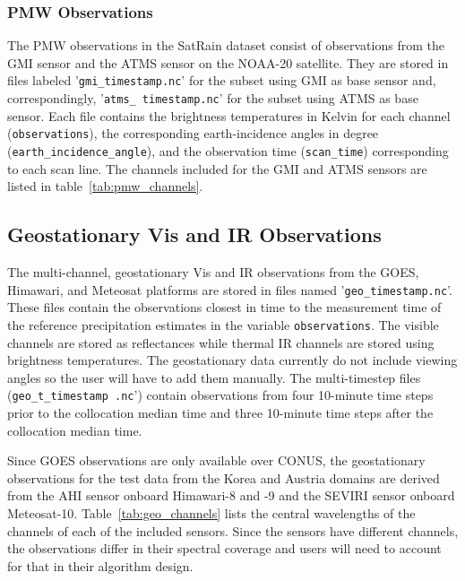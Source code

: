 \documentclass[11pt]{article}
\begin{document}
\subsubsection{PMW Observations}

The PMW observations in the SatRain dataset consist of observations from the GMI
sensor and the ATMS sensor on the NOAA-20 satellite. They are stored in files
labeled '\texttt{gmi\_\textlangle timestamp\textrangle.nc}' for the subset using
GMI as base sensor and, correspondingly, '\texttt{atms\_\textlangle
  timestamp\textrangle.nc}' for the subset using ATMS as base sensor. Each file
contains the brightness temperatures in Kelvin for each channel
(\texttt{observations}), the corresponding earth-incidence angles in degree
(\texttt{earth\_incidence\_angle}), and the observation time
(\texttt{scan\_time}) corresponding to each scan line. The channels included for
the GMI and ATMS sensors are listed in table~\ref{tab:pmw_channels}.

\subsection{Geostationary Vis and IR Observations}

The multi-channel, geostationary Vis and IR observations from the GOES,
Himawari, and Meteosat platforms are stored in files named
'\texttt{geo\_\textlangle timestamp\textrangle.nc}'. These files contain the
observations closest in time to the measurement time of the reference
precipitation estimates in the variable \texttt{observations}. The visible
channels are stored as reflectances while thermal IR channels are stored using
brightness temperatures. The geostationary data currently do not include
viewing angles so the user will have to add them manually. The multi-timestep
files (\texttt{geo\_t\_\textlangle timestamp \textrangle.nc}') contain
observations from four 10-minute time steps prior to the collocation median time and
three 10-minute time steps after the collocation median time.

Since GOES observations are only available over CONUS, the geostationary
observations for the test data from the Korea and Austria domains are derived
from the AHI sensor onboard Himawari-8 and -9 and the SEVIRI sensor onboard Meteosat-10.
Table~\ref{tab:geo_channels} lists the central wavelengths of the
channels of each of the included sensors. Since the sensors have different
channels, the observations differ in their spectral coverage and users will need
to account for that in their algorithm design.
\end{document}

